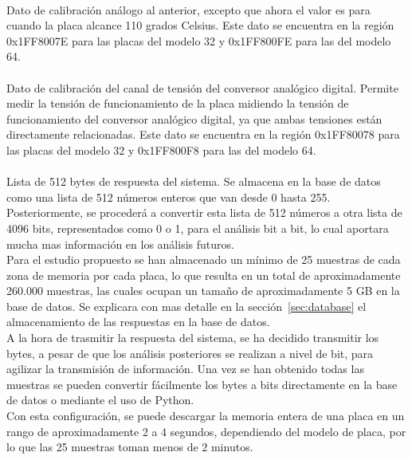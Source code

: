 \documentclass[spanish]{template/minim}
\newcommand{\dataelem}[1]{
    \noindent\textit{{\color{accent}{#1}}}
}
\begin{document}
\dataelem{Tensión de calibración a 110 grados}\\
Dato de calibración análogo al anterior, excepto que ahora el valor es para cuando la placa alcance 110 grados Celsius. Este dato se encuentra en la región {\color{accent}0x1FF8007E} para las placas del modelo 32 y {\color{accent}0x1FF800FE} para las del modelo 64.\\

\dataelem{Tensión de calibración del sensor de tensión}\\
Dato de calibración del canal de tensión del conversor analógico digital. Permite medir la tensión de funcionamiento de la placa midiendo la tensión de funcionamiento del conversor analógico digital, ya que ambas tensiones están directamente relacionadas. Este dato se encuentra en la región {\color{accent}0x1FF80078} para las placas del modelo 32 y {\color{accent}0x1FF800F8} para las del modelo 64.\\

\dataelem{Datos}\\
Lista de 512 bytes de respuesta del sistema. Se almacena en la base de datos como una lista de 512 números enteros que van desde 0 hasta 255. Posteriormente, se procederá a convertir esta lista de 512 números a otra lista de 4096 bits, representados como 0 o 1, para el análisis bit a bit, lo cual aportara mucha mas información en los análisis futuros.\\

Para el estudio propuesto se han almacenado un mínimo de 25 muestras de cada zona de memoria por cada placa, lo que resulta en un total de aproximadamente 260.000 muestras, las cuales ocupan un tamaño de aproximadamente 5 GB en la base de datos. Se explicara con mas detalle en la sección~\ref{sec:database} el almacenamiento de las respuestas en la base de datos.\\

A la hora de trasmitir la respuesta del sistema, se ha decidido transmitir los bytes, a pesar de que los análisis posteriores se realizan a nivel de bit, para agilizar la transmisión de información. Una vez se han obtenido todas las muestras se pueden convertir fácilmente los bytes a bits directamente en la base de datos o mediante el uso de Python.\\

Con esta configuración, se puede descargar la memoria entera de una placa en un rango de aproximadamente 2 a 4 segundos, dependiendo del modelo de placa, por lo que las 25 muestras toman menos de 2 minutos.\\
\end{document}
